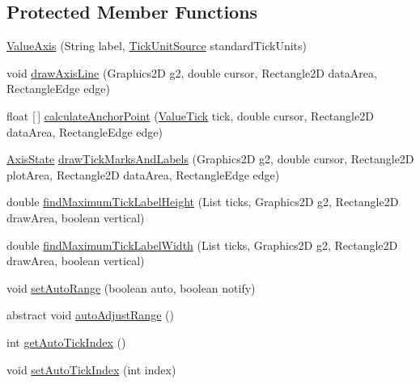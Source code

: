 \subsection*{Protected Member Functions}
\begin{DoxyCompactItemize}
\item 
\mbox{\hyperlink{classorg_1_1jfree_1_1chart_1_1axis_1_1_value_axis_a86472a48304fb1bcaaaaeb288049d0df}{Value\+Axis}} (String label, \mbox{\hyperlink{interfaceorg_1_1jfree_1_1chart_1_1axis_1_1_tick_unit_source}{Tick\+Unit\+Source}} standard\+Tick\+Units)
\item 
void \mbox{\hyperlink{classorg_1_1jfree_1_1chart_1_1axis_1_1_value_axis_a9138d0a07984b89b88559446f7ff9447}{draw\+Axis\+Line}} (Graphics2D g2, double cursor, Rectangle2D data\+Area, Rectangle\+Edge edge)
\item 
float \mbox{[}$\,$\mbox{]} \mbox{\hyperlink{classorg_1_1jfree_1_1chart_1_1axis_1_1_value_axis_a84f34702efc34e2108d4c0366d8e8f94}{calculate\+Anchor\+Point}} (\mbox{\hyperlink{classorg_1_1jfree_1_1chart_1_1axis_1_1_value_tick}{Value\+Tick}} tick, double cursor, Rectangle2D data\+Area, Rectangle\+Edge edge)
\item 
\mbox{\hyperlink{classorg_1_1jfree_1_1chart_1_1axis_1_1_axis_state}{Axis\+State}} \mbox{\hyperlink{classorg_1_1jfree_1_1chart_1_1axis_1_1_value_axis_a5f85aaa272b4f05064a494d1feca994d}{draw\+Tick\+Marks\+And\+Labels}} (Graphics2D g2, double cursor, Rectangle2D plot\+Area, Rectangle2D data\+Area, Rectangle\+Edge edge)
\item 
double \mbox{\hyperlink{classorg_1_1jfree_1_1chart_1_1axis_1_1_value_axis_a2aae38a5913c0eba14ff2c65dea65b28}{find\+Maximum\+Tick\+Label\+Height}} (List ticks, Graphics2D g2, Rectangle2D draw\+Area, boolean vertical)
\item 
double \mbox{\hyperlink{classorg_1_1jfree_1_1chart_1_1axis_1_1_value_axis_ab0553662b84f03897875dd9c87482e08}{find\+Maximum\+Tick\+Label\+Width}} (List ticks, Graphics2D g2, Rectangle2D draw\+Area, boolean vertical)
\item 
void \mbox{\hyperlink{classorg_1_1jfree_1_1chart_1_1axis_1_1_value_axis_ab96d2ddbeda94920cb4d5417bf7e41a0}{set\+Auto\+Range}} (boolean auto, boolean notify)
\item 
abstract void \mbox{\hyperlink{classorg_1_1jfree_1_1chart_1_1axis_1_1_value_axis_a7db5e263b4b1a191c146e577974374f1}{auto\+Adjust\+Range}} ()
\item 
int \mbox{\hyperlink{classorg_1_1jfree_1_1chart_1_1axis_1_1_value_axis_a385f69ce6843fd1b708610d3b2e5047a}{get\+Auto\+Tick\+Index}} ()
\item 
void \mbox{\hyperlink{classorg_1_1jfree_1_1chart_1_1axis_1_1_value_axis_af2dcbd83d70a20e207492f3b8b02d9d1}{set\+Auto\+Tick\+Index}} (int index)
\end{DoxyCompactItemize}


